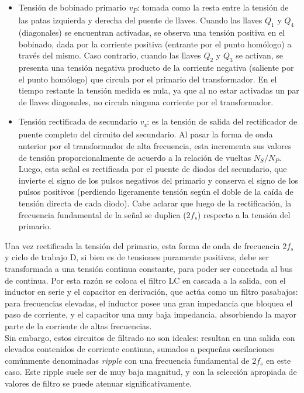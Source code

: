 \begin{itemize}
    \item {\Medium Tensión de bobinado primario \textit{v\textsubscript{P}}}: tomada como la resta entre la tensión de las patas izquierda y derecha del puente de llaves. Cuando las llaves $Q_1$ y $Q_4$ (diagonales) se encuentran activadas, se observa una tensión positiva en el bobinado, dada por la corriente positiva (entrante por el punto homólogo) a través del mismo. Caso contrario, cuando las llaves $Q_2$ y $Q_3$ se activan, se presenta una tensión negativa producto de la corriente negativa (saliente por el punto homólogo) que circula por el primario del transformador. En el tiempo restante la tensión medida es nula, ya que al no estar activadas un par de llaves diagonales, no circula ninguna corriente por el transformador.
    \item {\Medium Tensión rectificada de secundario \textit{v\textsubscript{x}}}: es la tensión de salida del rectificador de puente completo del circuito del secundario. Al pasar la forma de onda anterior por el transformador de alta frecuencia, esta incrementa sus valores de tensión proporcionalmente de acuerdo a la relación de vueltas $N_S/N_P$. Luego, esta señal es rectificada por el puente de diodos del secundario, que invierte el signo de los pulsos negativos del primario y conserva el signo de los pulsos positivos (perdiendo ligeramente tensión según el doble de la caída de tensión directa de cada diodo). Cabe aclarar que luego de la rectificación, la frecuencia fundamental de la señal se duplica ($2f_s$) respecto a la tensión del primario.
\end{itemize}

Una vez rectificada la tensión del primario, esta forma de onda de frecuencia $2f_s$ y ciclo de trabajo D, si bien es de tensiones puramente positivas, debe ser transformada a una tensión continua constante, para poder ser conectada al bus de continua. Por esta razón se coloca el filtro LC en cascada a la salida, con el inductor en serie y el capacitor en derivación, que actúa como un filtro pasabajos: para frecuencias elevadas, el inductor posee una gran impedancia que bloquea el paso de corriente, y el capacitor una muy baja impedancia, absorbiendo la mayor parte de la corriente de altas frecuencias.\\

Sin embargo, estos circuitos de filtrado no son ideales: resultan en una salida con elevados contenidos de corriente continua, sumados a pequeñas oscilaciones comúnmente denominadas \textit{ripple} con una frecuencia fundamental de $2f_s$ en este caso. Este ripple suele ser de muy baja magnitud, y con la selección apropiada de valores de filtro se puede atenuar significativamente.\\

